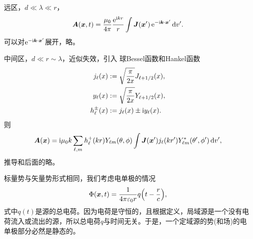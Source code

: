 远区，$d\ll\lambda\ll r$，
\[
    \bm A(\bm x,t)=\frac{\mu_0}{4\pi}\frac{\mathop{}\!\mathrm{e}^{\mathrm{i} kr}}r\int\bm J(\bm x')\mathop{}\!\mathrm{e}^{-\mathrm{i}\bm k\cdot\bm x'}\mathop{}\!\mathrm{d} v'.
\]
可以对$\mathop{}\!\mathrm{e}^{-\mathrm{i}\bm k\cdot\bm x'}$展开，略。

中间区，$d\ll r\sim\lambda$，近似失效，引入
球Bessel函数和Hankel函数
\begin{align}
    j_\ell(x)&:=\sqrt{\frac\pi{2x}}J_{\ell+1/2}(x),\\
    y_\ell(x)&:=\sqrt{\frac\pi{2x}}Y_{\ell+1/2}(x),\\
    h^\pm_\ell(x)&:=j_\ell(x)\pm\mathrm{i} y_\ell(x).
\end{align}
则
\[
    \bm A(\bm x)=\mathrm{i}\mu_0k\sum_{\ell,m}h_\ell^+(kr)Y_{\ell m}(\theta,\phi)\int\bm J(\bm x')j_\ell(kr')Y^\ast_{\ell m}(\theta',\phi')\mathop{}\!\mathrm{d} v',
\]
推导和后面的略。

标量势与矢量势形式相同，我们考虑电单极的情况
\[
    \Phi(\bm x,t)=\frac1{4\pi\varepsilon_0r}q\Bigl(t-\frac rc\Bigr),
\]
式中$q(t)$是源的总电荷。因为电荷是守恒的，且根据定义，局域源是一个没有电荷流入或流出的源，所以总电荷$q$与时间无关。于是，一个定域源的势(和场)的电单极部分必然是静态的。%

